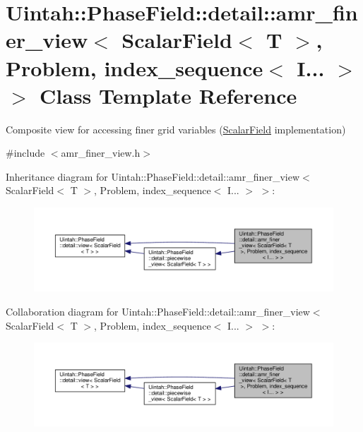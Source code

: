 \hypertarget{classUintah_1_1PhaseField_1_1detail_1_1amr__finer__view_3_01ScalarField_3_01T_01_4_00_01Problem_810ae3f886a4d3bdb2b37c629369a2ec}{}\section{Uintah\+:\+:Phase\+Field\+:\+:detail\+:\+:amr\+\_\+finer\+\_\+view$<$ Scalar\+Field$<$ T $>$, Problem, index\+\_\+sequence$<$ I... $>$ $>$ Class Template Reference}
\label{classUintah_1_1PhaseField_1_1detail_1_1amr__finer__view_3_01ScalarField_3_01T_01_4_00_01Problem_810ae3f886a4d3bdb2b37c629369a2ec}


Composite view for accessing finer grid variables (\hyperlink{structUintah_1_1PhaseField_1_1ScalarField}{Scalar\+Field} implementation)  




{\ttfamily \#include $<$amr\+\_\+finer\+\_\+view.\+h$>$}



Inheritance diagram for Uintah\+:\+:Phase\+Field\+:\+:detail\+:\+:amr\+\_\+finer\+\_\+view$<$ Scalar\+Field$<$ T $>$, Problem, index\+\_\+sequence$<$ I... $>$ $>$\+:\nopagebreak
\begin{figure}[H]
\begin{center}
\leavevmode
\includegraphics[width=350pt]{classUintah_1_1PhaseField_1_1detail_1_1amr__finer__view_3_01ScalarField_3_01T_01_4_00_01Problem_5955b0b99b60d322ead22e908697acaa}
\end{center}
\end{figure}


Collaboration diagram for Uintah\+:\+:Phase\+Field\+:\+:detail\+:\+:amr\+\_\+finer\+\_\+view$<$ Scalar\+Field$<$ T $>$, Problem, index\+\_\+sequence$<$ I... $>$ $>$\+:\nopagebreak
\begin{figure}[H]
\begin{center}
\leavevmode
\includegraphics[width=350pt]{classUintah_1_1PhaseField_1_1detail_1_1amr__finer__view_3_01ScalarField_3_01T_01_4_00_01Problem_1532c6371c2eb1abbcb22e40b922d2af}
\end{center}
\end{figure}
